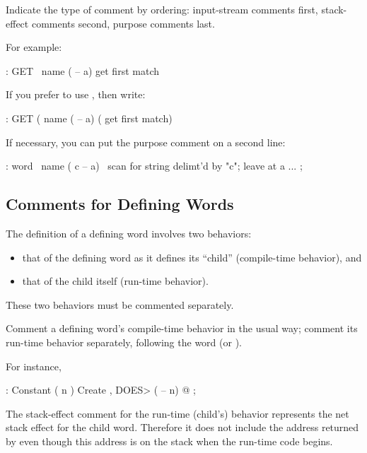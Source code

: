 \begin{tip}
Indicate the type of comment by ordering: input-stream comments first,
stack-effect comments second, purpose comments last.
\end{tip}
For example:
\begin{Code}
: GET   \   name   ( -- a)   get first match
\end{Code}
If you prefer to use \forth{(}, then write:
\begin{Code}
: GET   (   name  ( -- a)    ( get first match)
\end{Code}
If necessary, you can put the purpose comment on a second line:
\begin{Code}
: word   \   name   ( c -- a)
   \ scan for string delimt'd by "c"; leave at a
   ...  ;
\end{Code}
%

\subsection{Comments for Defining Words}%
The definition of a defining word involves two behaviors:

\begin{itemize}
\item that of the defining word as it defines its ``child''
(compile-time behavior), and
\item that of the child itself (run-time behavior).
\end{itemize}
These two behaviors must be commented separately.

%
\begin{tip}
Comment a defining word's compile-time behavior in the usual way;
comment its run-time behavior separately, following the word
 (or ).
\end{tip}
For instance,
\begin{Code}
: Constant  ( n ) Create ,
   DOES>  ( -- n)  @ ;
\end{Code}
The stack-effect comment for the run-time (child's) behavior
represents the net stack effect for the child word.  Therefore it does
not include the address returned by  even though this
address is on the stack when the run-time code begins.

